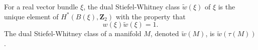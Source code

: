 For a real vector bundle $\xi$, the dual Stiefel-Whitney class $\tilde{w}(\xi)$ of $\xi$ is the unique element of $H^*(B(\xi), \mathbf{Z}_2)$ with the property that
$$w(\xi) \tilde{w}(\xi) = 1.$$
The dual Stiefel-Whitney class of a manifold $M$, denoted $\tilde{w}(M)$, is $\tilde{w}(\tau(M))$.
